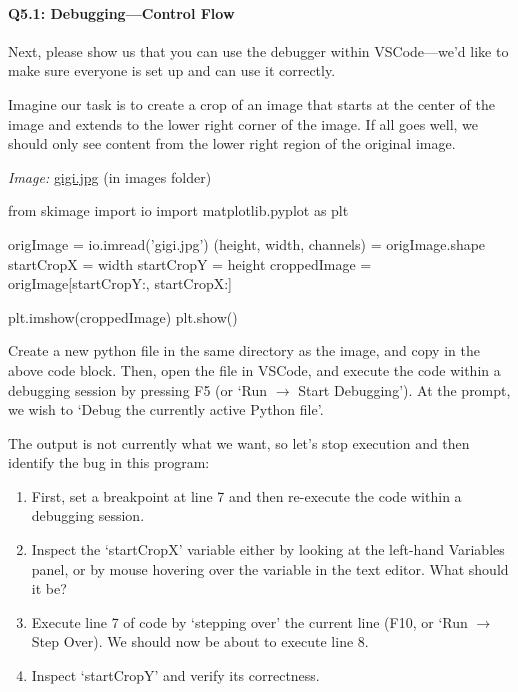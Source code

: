 \documentclass[11pt]{article}
\begin{document}

\pagebreak
\paragraph{Q5.1: Debugging---Control Flow} Next, please show us that you can use the debugger within VSCode---we'd like to make sure everyone is set up and can use it correctly. 

Imagine our task is to create a crop of an image that starts at the center of the image and extends to the lower right corner of the image. If all goes well, we should only see content from the lower right region of the original image.

\emph{Image:} \href{images/gigi.jpg}{gigi.jpg} (in images folder)

\begin{python}
from skimage import io
import matplotlib.pyplot as plt

origImage = io.imread('gigi.jpg')
(height, width, channels) = origImage.shape
startCropX = width %
startCropY = height %
croppedImage = origImage[startCropY:, startCropX:]

plt.imshow(croppedImage)
plt.show()
\end{python}

Create a new python file in the same directory as the image, and copy in the above code block. Then, open the file in VSCode, and execute the code within a debugging session by pressing F5 (or `Run $\rightarrow$ Start Debugging'). At the prompt, we wish to `Debug the currently active Python file'.

The output is not currently what we want, so let's stop execution and then identify the bug in this program:
\begin{enumerate}
    \item First, set a breakpoint at line 7 and then re-execute the code within a debugging session.
    \item Inspect the `startCropX' variable either by looking at the left-hand Variables panel, or by mouse hovering over the variable in the text editor. What should it be?
    \item Execute line 7 of code by `stepping over' the current line (F10, or `Run $\rightarrow$ Step Over). We should now be about to execute line 8.
    \item Inspect `startCropY' and verify its correctness.
\end{enumerate}
\end{document}

